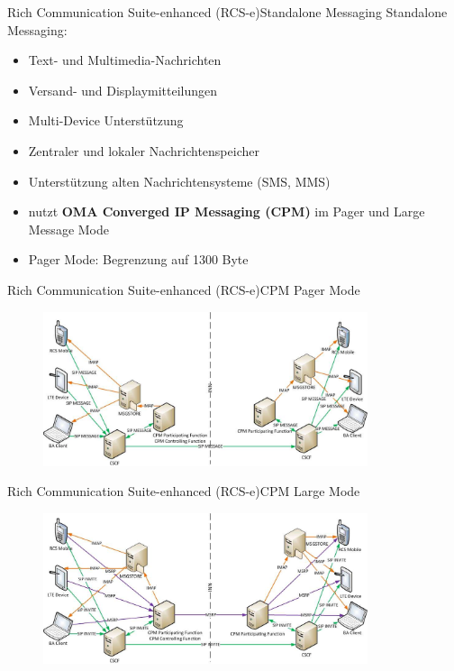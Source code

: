 \documentclass{beamer}
\begin{document}
\begin{frame}{Rich Communication Suite-enhanced (RCS-e)}{Standalone Messaging\cite{rcs:spec}}
	Standalone Messaging:
	\begin{itemize}
		\item Text- und Multimedia-Nachrichten
		\item Versand- und Displaymitteilungen
		\item Multi-Device Unterstützung
		\item Zentraler und lokaler Nachrichtenspeicher
		\item Unterstützung alten Nachrichtensysteme (SMS, MMS)
		\item nutzt \textbf{OMA Converged IP Messaging (CPM)} im Pager und Large Message Mode
		\item Pager Mode: Begrenzung auf 1300 Byte
	\end{itemize}
\end{frame}

\begin{frame}{Rich Communication Suite-enhanced (RCS-e)}{CPM Pager Mode\cite{rcs:spec}}
	\begin{figure}[htm]
		\includegraphics[width=0.85\textwidth]{img/rcs-e-pager}
	\end{figure}
\end{frame}

\begin{frame}{Rich Communication Suite-enhanced (RCS-e)}{CPM Large Mode\cite{rcs:spec}}
	\begin{figure}[htm]
		\includegraphics[width=0.85\textwidth]{img/rcs-e-large}
	\end{figure}
\end{frame}
\end{document}
